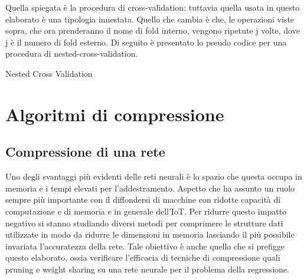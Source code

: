 \documentclass[12pt]{report}
\begin{document}
Quella spiegata è la procedura di cross-validation: tuttavia quella usata in questo elaborato è una tipologia innestata. Quello che cambia è che, le operazioni viste sopra, che ora prenderanno il nome di fold interno, vengono ripetute j volte, dove j è il numero di fold esterno. Di seguito è presentato lo pseudo codice per una procedura di nested-cross-validation.

\makeatletter
\def\BState{\State\hskip-\ALG@thistlm}
\makeatother

\begin{algorithm}
\caption{Nested Cross Validation}
\end{algorithm}

\chapter{Algoritmi di compressione}

\section{Compressione di una rete}

Uno degli svantaggi più evidenti delle reti neurali è lo spazio che questa occupa in memoria e i tempi elevati per l’addestramento. Aspetto che ha assunto un ruolo sempre più importante con il diffondersi di macchine con ridotte capacità di computazione e di memoria e in generale dell’IoT. 
Per ridurre questo impatto negativo si stanno studiando diversi metodi per comprimere le strutture dati utilizzate in modo da ridurre le dimensioni in memoria lasciando il più possibile invariata l’accuratezza della rete. Tale obiettivo è anche quello che si prefigge questo elaborato, ossia verificare l’efficacia di tecniche di compressione quali pruning e weight sharing su una rete neurale per il problema della regressione. 
\end{document}
